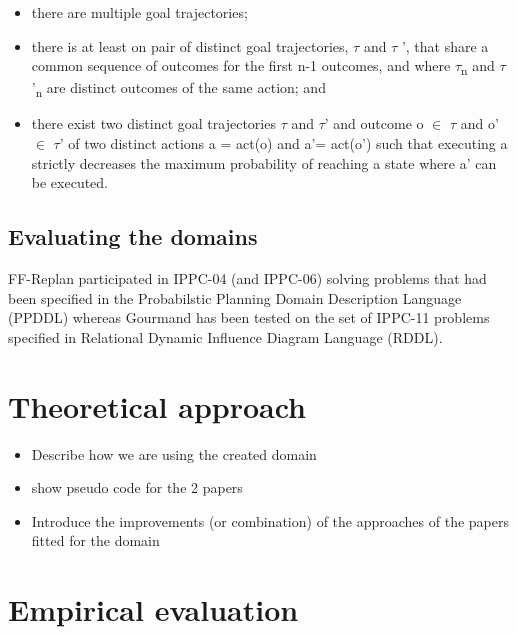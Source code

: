 \documentclass[runningheads,a4paper]{llncs}
\begin{document}

\begin{itemize}
	\item there are multiple goal trajectories;
	\item there is at least on pair of distinct goal trajectories, $\tau$ and $\tau$ ', that share a common sequence of outcomes for the first n-1 outcomes, and where $\tau$\textsubscript{n} and $\tau$'\textsubscript{n} are distinct outcomes of the same action; and
	\item there exist two distinct goal trajectories $\tau$ and $\tau$' and outcome o $\in$ $\tau$ and o' $\in$ $\tau$' of two distinct actions a = act(o) and a'= act(o') such that executing a strictly decreases the maximum probability of reaching a state where a' can be executed.
\end{itemize}


\subsection{Evaluating the domains}
FF-Replan participated in IPPC-04 (and IPPC-06) solving problems that had been specified in the Probabilstic Planning Domain Description Language (PPDDL) whereas Gourmand has been tested on the set of IPPC-11 problems specified in Relational Dynamic Influence Diagram Language (RDDL)\cite{sanner2008rddl}.



\section{Theoretical approach}

\begin{itemize}
	\item Describe how we are using the created domain
	\item show pseudo code for the 2 papers
	\item Introduce the improvements (or combination) of the approaches of the papers fitted for the domain
\end{itemize}


\section{Empirical evaluation}
\end{document}
